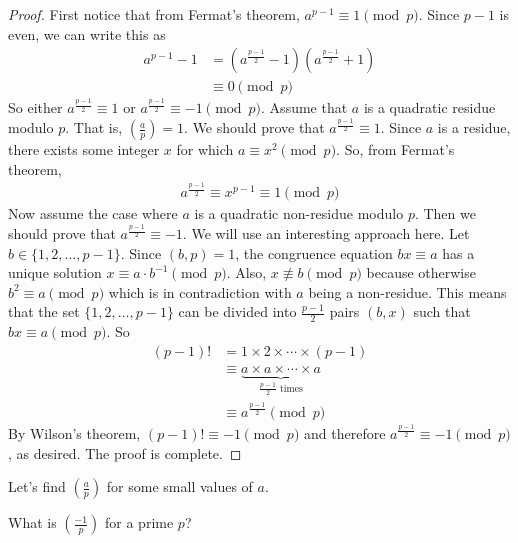 \documentclass[main.tex]{subfile}
\begin{document}
	\begin{proof}
		First notice that from Fermat's theorem, $a^{p-1} \equiv 1 \pmod p$. Since $p-1$ is even, we can write this as
		\begin{align*}
			a^{p-1} - 1
				& = \left(a^{\frac{p-1}{2}} - 1\right)\left(a^{\frac{p-1}{2}} + 1\right)\\
				& \equiv 0 \pmod p
		\end{align*}
		So either $a^{\frac{p-1}{2}} \equiv 1$ or $a^{\frac{p-1}{2}} \equiv -1 \pmod p$.
		Assume that $a$ is a quadratic residue modulo $p$. That is, $ \left(\frac{a}{p}\right)=1$. We should prove that $a^{\frac{p-1}{2}} \equiv 1$. Since $a$ is a residue, there exists some integer $x$ for which $a \equiv x^2 \pmod p$. So, from Fermat's theorem,
		\begin{align*}
			a^{\frac{p-1}{2}} \equiv x^{p-1} \equiv 1 \pmod p
		\end{align*}
		Now assume the case where $a$ is a quadratic non-residue modulo $p$. Then we should prove that $a^{\frac{p-1}{2}} \equiv -1$. We will use an interesting approach here. Let $b \in \{1,2,\ldots,p-1\}$. Since $(b,p)=1$, the congruence equation $bx \equiv a$ has a unique solution $x \equiv a \cdot b^{-1} \pmod p$. Also, $x \not \equiv b \pmod p$ because otherwise $b^2 \equiv a \pmod p$ which is in contradiction with $a$ being a non-residue. This means that the set $\{1,2,\ldots,p-1\}$ can be divided into $\displaystyle \frac{p-1}{2}$ pairs $(b,x)$ such that $bx \equiv a \pmod p$. So
		\begin{align*}
			(p-1)!
				& = 1 \times 2 \times \cdots \times (p-1)\\
				& \equiv \underbrace{a \times a \times \cdots \times a}_{\frac{p-1}{2}\text{ times}}\\
				& \equiv a^{\frac{p-1}{2}} \pmod p
		\end{align*}
		By Wilson's theorem, $(p-1)! \equiv -1 \pmod p$ and therefore $a^{\frac{p-1}{2}} \equiv -1 \pmod p$, as desired. The proof is complete.
	\end{proof}
Let's find $\left(\frac{a}{p}\right)$ for some small values of $a$.
	\begin{problem}
		What is $\left(\frac{-1}{p}\right)$ for a prime $p$?
	\end{problem}
\end{document}
